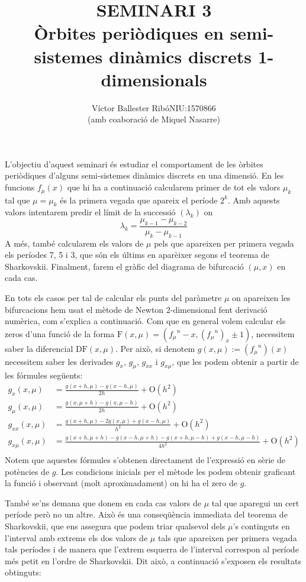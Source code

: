 \documentclass[a4paper]{article}
\title{\bfseries\large SEMINARI 3\\\vspace{0.25cm}Òrbites periòdiques en semi-sistemes dinàmics discrets 1-dimensionals}
\author{Víctor Ballester Ribó\endgraf NIU:1570866\\(amb co\lgem aboració de Miquel Nasarre)}
\date{\parbox{\linewidth}{\centering
  Sistemes dinàmics\endgraf
  Grau en Matemàtiques\endgraf
  Universitat Autònoma de Barcelona\endgraf
  Febrer de 2023}}
\newcommand{\vf}[1]{\boldsymbol{\mathrm{#1}}} %
\renewcommand{\O}{\mathrm{O}} %
\theoremstyle{definition}
\begin{document}
\maketitle
L'objectiu d'aquest seminari és estudiar el comportament de les òrbites periòdiques d'alguns semi-sistemes dinàmics discrets en una dimensió. En les funcions $f_\mu(x)$ que hi ha a continuació calcularem primer de tot els valors $\mu_k$ tal que $\mu=\mu_k$ és la primera vegada que apareix el període $2^k$. Amb aquests valors intentarem predir el límit de la successió $(\lambda_k)$ on $$\lambda_k=\frac{\mu_{k-1}-\mu_{k-2}}{\mu_{k}-\mu_{k-1}}$$ A més, també calcularem els valors de $\mu$ pels que apareixen per primera vegada els períodes 7, 5 i 3, que són els últims en aparèixer segons el teorema de Sharkovskii. Finalment, farem el gràfic del diagrama de bifurcació $(\mu, x)$ en cada cas.

En tots els casos per tal de calcular els punts del paràmetre $\mu$ on apareixen les bifurcacions hem usat el mètode de Newton 2-dimensional fent derivació numèrica, com s'explica a continuació.
Com que en general volem calcular els zeros d'una funció de la forma $\vf{F}(x, \mu) = ({f_\mu}^n - x, {({f_\mu}^n)}_x \pm 1)$, necessitem saber la diferencial $\vf{DF}(x,\mu)$. Per això, si denotem $g(x,\mu):={({f_\mu}^n)}(x)$ necessitem saber les derivades ${g}_x$, ${g}_\mu$, ${g}_{xx}$ i ${g}_{x\mu}$, que les podem obtenir a partir de les fórmules següents:
\begin{align*}
  g_x(x,\mu)      & =\frac{g(x+h,\mu)-g(x-h,\mu)}{2h} + \O(h^2)                                 \\
  g_\mu(x,\mu)    & =\frac{g(x,\mu+h)-g(x,\mu-h)}{2h} + \O(h^2)                                 \\
  g_{xx}(x,\mu)   & =\frac{g(x+h,\mu)-2g(x,\mu)+g(x-h,\mu)}{h^2} + \O(h^2)                      \\
  g_{x\mu}(x,\mu) & =\frac{g(x+h,\mu+h)-g(x-h,\mu+h)-g(x+h,\mu-h)+g(x-h,\mu-h)}{4h^2} + \O(h^2) \\
\end{align*}
Notem que aquestes fórmules s'obtenen directament de l'expressió en sèrie de potències de $g$. Les condicions inicials per el mètode les podem obtenir graficant la funció i observant (molt aproximadament) on hi ha el zero de $g$.

També se'ns demana que donem en cada cas valors de $\mu$ tal que aparegui un cert període però no un altre. Això és una conseqüència immediata del teorema de Sharkovskii, que ens assegura que podem triar qualsevol dels $\mu$'s continguts en l'interval amb extrems els dos valors de $\mu$ tals que apareixen per primera vegada tals períodes i de manera que l'extrem esquerra de l'interval correspon al període més petit en l'ordre de Sharkovskii.
Dit això, a continuació s'exposen els resultats obtinguts:
\newpage
\end{document}
